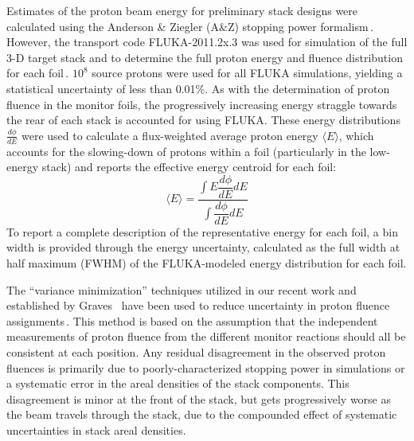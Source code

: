Estimates of the proton beam energy for preliminary stack designs were calculated using the Anderson \& Ziegler (A\&Z) stopping power formalism\,\cite{Andersen_Ziegler_1977,Ziegler1985,Ziegler1999}.
However, the 
transport code FLUKA-2011.2x.3 was used for simulation of the full 3-D target stack and to determine the full proton energy and fluence distribution for each foil\,\cite{Bohlen2014a}. 
$10^8$ source protons were used for all FLUKA simulations, 
yielding a statistical uncertainty 
of less than 0.01\%.
As with the determination of proton fluence in the monitor foils, the progressively increasing energy straggle towards the rear of each stack is accounted for using 
FLUKA.
These energy distributions $\frac{d\phi}{dE}$ were used to calculate a flux-weighted average proton  energy $\langle E \rangle$, which accounts for the slowing-down of protons within a foil (particularly in the low-energy stack) and reports the effective  energy centroid for each foil:
\begin{equation}
\langle E \rangle = \dfrac{{\displaystyle\int E \dfrac{d\phi}{dE} dE}}{{\displaystyle\int \dfrac{d\phi}{dE} dE}}
\end{equation}
To report a complete description of the representative energy for each foil, a bin width is provided through the  energy uncertainty, calculated as the full width at half maximum (FWHM) of the FLUKA-modeled energy distribution for each foil.


The \enquote{variance minimization} techniques utilized in our recent work and established by Graves \etal\ have been used to reduce uncertainty in proton fluence assignments\,\cite{Voyles2018a,Graves2016}.
This method is based on the assumption that the independent measurements of proton fluence from the different monitor reactions 
should all be consistent at each 
position.
Any residual disagreement in the  observed proton fluences is  primarily due to poorly-characterized stopping power in simulations or a systematic error in the 
areal densities of the stack components. 
This disagreement is minor at the front of the stack, but gets progressively worse as the beam travels through the stack, due to the compounded effect of systematic uncertainties in stack areal densities.



